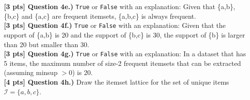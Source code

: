 \documentclass[paper=a4, fontsize=11pt]{scrartcl} %
\begin{document}
\textbf{[3 pts] Question 4e.)} \verb"True" or \verb"False" with an explanation: Given that \{a,b\}, \{b,c\} and \{a,c\} are frequent itemsets, \{a,b,c\} is always frequent. \\

\textbf{[3 pts] Question 4f.)} \verb"True" or \verb"False" with an explanation: Given that the support of \{a,b\} is 20 and the support of \{b,c\} is 30, the support of \{b\} is larger than 20 but smaller than 30. \\

\textbf{[3 pts] Question 4g.)} \verb"True" or \verb"False" with an explanation: In a dataset that has 5 items, the maximum number of size-2 frequent itemsets that can be extracted (assuming minsup $> 0$) is 20. \\

\textbf{[4 pts] Question 4h.)} Draw the itemset lattice for the set of unique items $\mathcal{I} = \{ a, b, c \}$. \\
\end{document}
